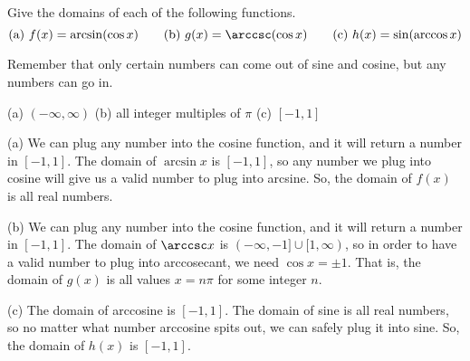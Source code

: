 %
%


\subsection*{\Conceptual}


\begin{Mquestion}
Give the domains of each of the following functions.
\[\mbox{(a) } f(x)=\arcsin(\cos x)\qquad
\mbox{(b) }g(x)=\arccsc(\cos x)\qquad
\mbox{(c) } h(x)=\sin(\arccos x)\]
\end{Mquestion}
\begin{hint}
Remember that only certain numbers can come out of sine and cosine, but any numbers can go in.
\end{hint}
\begin{answer}
(a) $(-\infty,\infty)$ \qquad (b) all integer multiples of $\pi$\qquad
(c) $[-1,1]$
\end{answer}
\begin{solution}
(a) We can plug any number into the cosine function, and it will return a number in $[-1,1]$. The domain of $\arcsin x$ is $[-1,1]$, so any number we plug into cosine will give us a valid number to plug into arcsine. So, the domain of $f(x)$ is all real numbers.

(b) We can plug any number into the cosine function, and it will return a number in $[-1,1]$. The domain of $\arccsc x$ is $(-\infty,-1] \cup [1,\infty)$, so in order to have
a valid number to plug into arccosecant, we need $\cos x = \pm 1$. That is, the domain of $g(x)$ is all values $x=n\pi$ for some integer $n$.

(c) The domain of arccosine is $[-1,1]$. The domain of sine is all real numbers, so no matter what number arccosine spits out, we can safely plug it into sine. So, the domain of $h(x)$ is $[-1,1]$.
\end{solution}



